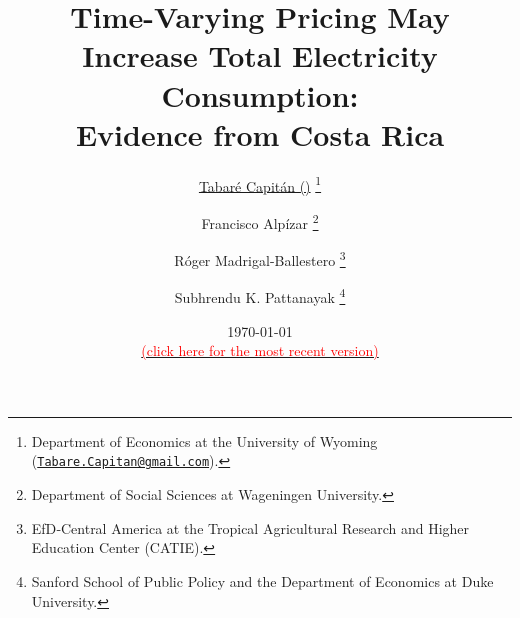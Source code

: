 \title{\vspace{-2cm}
      \normalsize{\textbf{Time-Varying Pricing May Increase Total Electricity Consumption: \\ Evidence from Costa Rica}}
      }

\author{

    \small{\href{www.TabareCapitan.com}{Tabaré Capitán (\Letter)}}
        \thanks{
           Department of Economics at the University of Wyoming (\href{mailto:Tabare.Capitan@gmail.com}{\texttt{Tabare.Capitan@gmail.com}}).
        }

  \and
    \small{Francisco Alpízar}
        \thanks{
          Department of Social Sciences at Wageningen University.
        }

  \and
    \small{Róger Madrigal-Ballestero}
        \thanks{
          EfD‐Central America at the Tropical Agricultural Research and Higher Education Center (CATIE).
        }

  \and
    \small{Subhrendu K. Pattanayak}
        \thanks{
          Sanford School of Public Policy and the Department of Economics at Duke University.
        }
}


\date{
  \vspace{0.2cm}
  \footnotesize{\today}
  \\
  \href{https://www.tabarecapitan.com}
  {\footnotesize{\textcolor{red}{(click here for the most recent version)}}}
}

\maketitle

\thispagestyle{empty}   %

